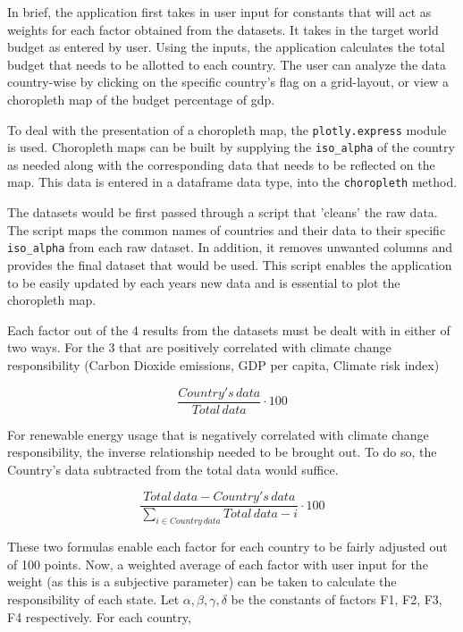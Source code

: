 \documentclass[fontsize=11pt]{article}
\begin{document}
In brief, the application first takes in user input for constants that will act as weights for each factor obtained
from the datasets.
It takes in the target world budget as entered by user.
Using the inputs, the application calculates the total budget that needs to be allotted to each country.
The user can analyze the data country-wise by clicking on the specific country's flag on a grid-layout, or view a
choropleth map of the budget percentage of gdp.\newline

To deal with the presentation of a choropleth map, the \texttt{plotly.express}
module is used.
Choropleth maps can be built by supplying the \texttt{iso\_alpha} of the country as needed along with the corresponding
data that needs to be reflected on the map.
This data is entered in a dataframe data type, into the \texttt{choropleth} method.  \newline

The datasets would be first passed through a script that 'cleans' the raw data.
The script maps the common names of countries and their data to their specific
\texttt{iso\_alpha} from each raw dataset.
In addition, it removes unwanted columns and provides the final dataset that would be used.
This script enables the application to be easily updated by each years new data and is essential to plot the choropleth map.
\newline

Each factor out of the 4 results from the datasets must be
dealt with in either of two ways.
For the 3 that are positively correlated with climate change responsibility (Carbon Dioxide emissions,
GDP per capita, Climate risk index)

\[
\frac{Country's \, data}{Total \, data} \cdot 100
\]

For renewable energy usage that is negatively correlated with climate change responsibility, the
inverse relationship needed to be brought out.
To do so, the Country's data subtracted from the total data would suffice.

\[
\frac{Total \, data - Country's \, data}{\displaystyle\sum_{i \in Country \, data} Total \, data -  i } \cdot 100
\]

These two formulas enable each factor for each country to be fairly adjusted out of 100 points.
Now, a weighted average of each factor with user input for the weight (as this is a subjective parameter) can be taken
to calculate the responsibility of each state.
Let $\alpha, \beta, \gamma, \delta$ be the constants of factors F1, F2, F3, F4 respectively.
For each country,
\end{document}
